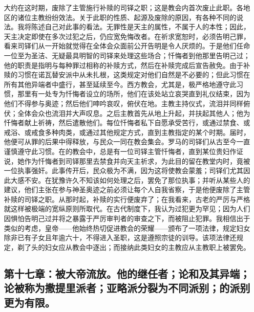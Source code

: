 大约在这时期，废除了主管施行补赎的司铎之职；这是教会内首次废止此职。各地区的诸位主教纷纷效法。关于此职的性质、起源及废除的原因，有各种不同的说法。我将陈述自己对此事的看法。无罪性是天主的属性，不属于人的本性；因此，天主决定即使在多次过犯之后，仍应宽免悔改者。在祈求宽恕时，必须告明己罪，看来司铎们从一开始就觉得在全体会众面前公开告明是令人厌烦的。于是他们任命一位至为圣洁、无疑最具明智的司铎来处理这些场合；忏悔者到他那里告明己过；他的职责是指明与每种罪过相称的补赎方式，然后在补赎完成后宣告赦免。由于补赎的习惯在诺瓦替安派中从未扎根，这类规定对他们自然是不必要的；但此习惯在所有其他异端者中盛行，甚至延续至今。西方教会，尤其是，极严格地遵守此习惯，那里有一处专为忏悔者设立的场所，他们在该处站立哀哭直到礼仪结束，因为他们不得参与奥迹；然后他们呻吟哀叹，俯伏在地。主教主持仪式，流泪并同样俯伏；全体会众也流泪并大声叹息。之后主教首先从地上升起，并扶起其他人；他为忏悔者献上祈祷，然后遣散他们。每位忏悔者私下自愿承受苦行，或通过禁食、或戒浴、或戒食多种肉类，或通过其他规定方式，直到主教指定的某个时期。届时，他便可从罪的后果中得释放，与民众一同在教会集会。罗马的司铎们从古至今一直谨慎遵守此习惯。在的教会中，总是有一位司铎主管忏悔者，直到某位贵妇作证说，她作为忏悔者到司铎那里去禁食并向天主祈求，为此目的留在教堂内时，竟被一位执事强奸。此事传开后，民众极为不满，因为这将使教会蒙羞；司铎们尤其因此大感不安。在犹豫许久不知该如何处理之后，罢免了那位执事；并听从某些人的建议，他们主张在参与神圣奥迹之前必须让每个人自我省察，于是他便废除了主管补赎的司铎之职。从那时起，补赎的实行便废弃了；在我看来，古老的严厉与严格就这样被极端的宽纵原则所取代。在古代制度下，我认为过犯更为罕见；因为人们因惧怕告明己过并将之暴露于严厉审判者的审查之下，而被阻止犯罪。我相信出于类似的考虑，皇帝——他始终热切促进教会的荣耀——颁布了一项法律，规定妇女除非已有子女且年逾六十，不得进入圣职，这是遵照宗徒的训导。该项法律还规定，剃了头的妇女应从教会中逐出；而接纳此类妇女的主教应从主教职上被罢免。\par


\subsection{第十七章：被大帝流放。他的继任者；论和及其异端；论被称为撒提里派者；亚略派分裂为不同派别；的派别更为有限。}


